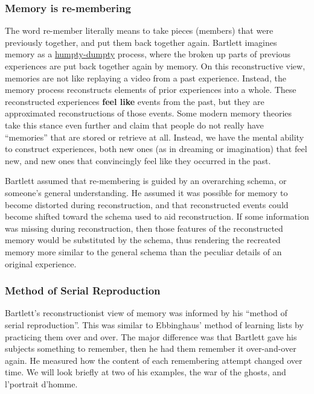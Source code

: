 \documentclass[
  oneside,
  12pt]{crumpbook}
\begin{document}
\hypertarget{memory-is-re-membering}{%
\subsubsection{Memory is re-membering}\label{memory-is-re-membering}}

The word re-member literally means to take pieces (members) that were previously together, and put them back together again. Bartlett imagines memory as a \href{https://en.wikipedia.org/wiki/Humpty_Dumpty}{humpty-dumpty} process, where the broken up parts of previous experiences are put back together again by memory. On this reconstructive view, memories are not like replaying a video from a past experience. Instead, the memory process reconstructs elements of prior experiences into a whole. These reconstructed experiences \textbf{feel like} events from the past, but they are approximated reconstructions of those events. Some modern memory theories take this stance even further and claim that people do not really have ``memories'' that are stored or retrieve at all. Instead, we have the mental ability to construct experiences, both new ones (as in dreaming or imagination) that feel new, and new ones that convincingly feel like they occurred in the past.

Bartlett assumed that re-membering is guided by an overarching schema, or someone's general understanding. He assumed it was possible for memory to become distorted during reconstruction, and that reconstructed events could become shifted toward the schema used to aid reconstruction. If some information was missing during reconstruction, then those features of the reconstructed memory would be substituted by the schema, thus rendering the recreated memory more similar to the general schema than the peculiar details of an original experience.

\hypertarget{method-of-serial-reproduction}{%
\subsubsection{Method of Serial Reproduction}\label{method-of-serial-reproduction}}

Bartlett's reconstructionist view of memory was informed by his ``method of serial reproduction''. This was similar to Ebbinghaus' method of learning lists by practicing them over and over. The major difference was that Bartlett gave his subjects something to remember, then he had them remember it over-and-over again. He measured how the content of each remembering attempt changed over time. We will look briefly at two of his examples, the war of the ghosts, and l'portrait d'homme.
\end{document}
